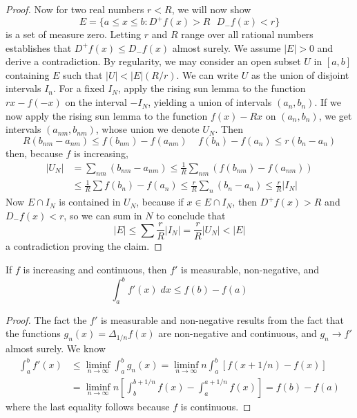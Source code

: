 \begin{proof}
    Now for two real numbers $r < R$, we will now show
    \[ E = \{ a \leq x \leq b : D^+ f(x) > R\ \ \ D_-f(x) < r \} \]
    is a set of measure zero. Letting $r$ and $R$ range over all rational numbers establishes that $D^+ f(x) \leq D_-f(x)$ almost surely. We assume $|E| > 0$ and derive a contradiction. By regularity, we may consider an open subset $U$ in $[a,b]$ containing $E$ such that $|U| < |E| (R/r)$. We can write $U$ as the union of disjoint intervals $I_n$. For a fixed $I_N$, apply the rising sun lemma to the function $rx - f(-x)$ on the interval $-I_N$, yielding a union of intervals $(a_n,b_n)$. If we now apply the rising sun lemma to the function $f(x) - Rx$ on $(a_n, b_n)$, we get intervals $(a_{nm}, b_{nm})$, whose union we denote $U_N$. Then
    \[ R(b_{nm} - a_{nm}) \leq f(b_{nm}) - f(a_{nm})\ \ \ \ \ f(b_n) - f(a_n) \leq r(b_n - a_n) \]
    then, because $f$ is increasing,
    \begin{align*}
      |U_N| &= \sum_{nm} (b_{nm} - a_{nm}) \leq \frac{1}{R} \sum_{nm} (f(b_{nm}) - f(a_{nm}))\\
      &\leq \frac{1}{R} \sum f(b_n) - f(a_n) \leq \frac{r}{R} \sum_n (b_n - a_n) \leq \frac{r}{R} |I_N|
    \end{align*}
    Now $E \cap I_N$ is contained in $U_N$, because if $x \in E \cap I_N$, then $D^+ f(x) > R$ and $D_- f(x) < r$, so we can sum in $N$ to conclude that
    \[ |E| \leq \sum \frac{r}{R} |I_N| = \frac{r}{R} |U_N| < |E| \]
    a contradiction proving the claim.
\end{proof}

\begin{corollary}
  If $f$ is increasing and continuous, then $f'$ is measurable, non-negative, and
  \[ \int_a^b f'(x)\; dx \leq f(b) - f(a) \]
\end{corollary}
\begin{proof}
  The fact the $f'$ is measurable and non-negative results from the fact that the functions $g_n(x) = \Delta_{1/n} f(x)$ are non-negative and continuous, and $g_n \to f'$ almost surely. We know
  \begin{align*}
    \int_a^b f'(x) &\leq \liminf_{n \to \infty} \int_a^b g_n(x) = \liminf_{n \to \infty} n \int_a^b [f(x + 1/n) - f(x)]\\
    &= \liminf_{n \to \infty} n \left[ \int_b^{b+1/n} f(x) - \int_a^{a + 1/n} f(x) \right] = f(b) - f(a)
  \end{align*}
  where the last equality follows because $f$ is continuous.
\end{proof}

